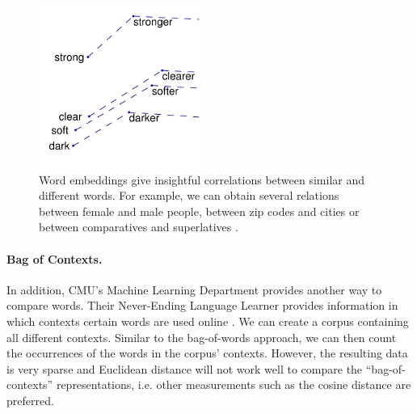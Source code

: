 \begin{figure}[h]
\begin{minipage}{.3\textwidth}
\end{minipage}
\begin{minipage}{.3\textwidth}
  \centering
  \includegraphics[width=\linewidth]{images/glove_cs}
\end{minipage}
\caption{Word embeddings give insightful correlations between similar and different words. For example, we can obtain several relations between female and male people, between zip codes and cities or between comparatives and superlatives \cite{pennington2014glove}.}
\label{fig:glove}
\end{figure}

\paragraph{Bag of Contexts.} In addition, CMU's Machine Learning Department provides another way to compare words. Their Never-Ending Language Learner provides information in which contexts certain words are used online \cite{nell_pairs}. We can create a corpus containing all different contexts. Similar to the bag-of-words approach, we can then count the occurrences of the words in the corpus' contexts. However, the resulting data is very sparse and Euclidean distance will not work well to compare the ``bag-of-contexts'' representations, i.e. other measurements such as the cosine distance are preferred.

